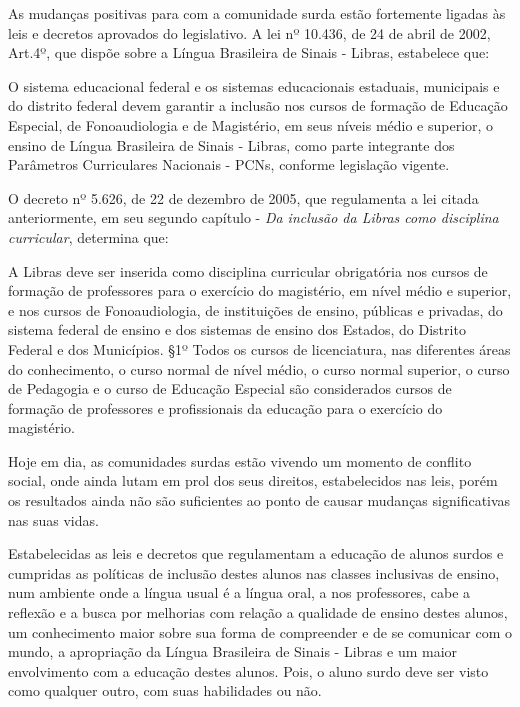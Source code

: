 \documentclass[brasil]{abnt}
\begin{document}
	As mudanças positivas para com a comunidade surda estão fortemente ligadas às leis e decretos aprovados do legislativo. A lei nº 10.436, de 24 de abril de 2002, Art.4º, que dispõe sobre a 
	Língua Brasileira de Sinais - Libras, estabelece que:
		
			\begin{citacao} O sistema educacional federal e os sistemas educacionais estaduais, municipais e do distrito federal devem garantir a inclusão nos cursos de formação de Educação Especial, de 
							Fonoaudiologia e de Magistério, em seus níveis médio e superior, o ensino de Língua Brasileira de Sinais - Libras, como parte integrante dos Parâmetros Curriculares Nacionais - 
							PCNs, conforme legislação vigente.
			\end{citacao}
		
	O decreto nº 5.626, de 22 de dezembro de 2005, que regulamenta a lei citada anteriormente, em seu segundo capítulo - \textit{Da inclusão da Libras como disciplina curricular}, determina que:
		
			\begin{citacao} A Libras deve ser inserida como disciplina curricular obrigatória nos cursos de formação de professores para o exercício do magistério, em nível médio e superior, e nos cursos de 
							Fonoaudiologia, de instituições de ensino, públicas e privadas, do sistema federal de ensino e dos sistemas de ensino dos Estados, do Distrito Federal e dos Municípios.
							\S 1º Todos os cursos de licenciatura, nas diferentes áreas do conhecimento, o curso normal de nível médio, o curso normal superior, o curso de Pedagogia e o curso de Educação 
							Especial são considerados cursos de formação de professores e profissionais da educação para o exercício do magistério. 
			\end{citacao}
	
	
	Hoje em dia, as comunidades surdas estão vivendo um momento de conflito social, onde ainda lutam em prol dos seus direitos, estabelecidos nas leis, porém os resultados ainda não são suficientes ao 
	ponto de causar mudanças significativas nas suas vidas. 
		
	Estabelecidas as leis e decretos que regulamentam a educação de alunos surdos e cumpridas as políticas de inclusão destes alunos nas classes inclusivas de ensino, num ambiente onde a língua usual 
	é a língua oral, a nos professores, cabe a reflexão e a busca por melhorias com relação a qualidade de ensino destes alunos, um conhecimento maior sobre sua forma de compreender e de se comunicar
	com o mundo, a apropriação da Língua Brasileira de Sinais - Libras e um maior envolvimento com a educação destes alunos. Pois, o aluno surdo deve ser visto como qualquer outro, com suas habilidades
	ou não. 			     
	
\end{document}
